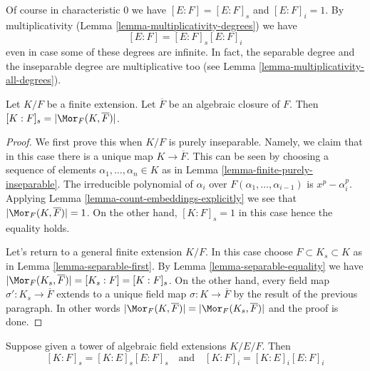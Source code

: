 \noindent
Of course in characteristic $0$ we have $[E : F] = [E : F]_s$ and
$[E : F]_i = 1$. By multiplicativity
(Lemma \ref{lemma-multiplicativity-degrees}) we have
$$
[E : F] = [E : F]_s [E : F]_i
$$
even in case some of these degrees are infinite. In fact, the separable
degree and the inseparable degree are multiplicative too (see
Lemma \ref{lemma-multiplicativity-all-degrees}).

\begin{lemma}
\label{lemma-separable-degree}
Let $K/F$ be a finite extension. Let $\overline{F}$ be an algebraic
closure of $F$. Then $[K : F]_s = |\Mor_F(K, \overline{F})|$.
\end{lemma}

\begin{proof}
We first prove this when $K/F$ is purely inseparable. Namely, we claim that
in this case there is a unique map $K \to \overline{F}$. This can be
seen by choosing a sequence of elements $\alpha_1, \ldots, \alpha_n \in K$
as in Lemma \ref{lemma-finite-purely-inseparable}. The irreducible polynomial
of $\alpha_i$ over $F(\alpha_1, \ldots, \alpha_{i - 1})$ is $x^p - \alpha_i^p$.
Applying Lemma \ref{lemma-count-embeddings-explicitly} we see that
$|\Mor_F(K, \overline{F})| = 1$. On the other hand, $[K : F]_s = 1$
in this case hence the equality holds.

\medskip\noindent
Let's return to a general finite extension $K/F$. In this case
choose $F \subset K_s \subset K$ as in Lemma \ref{lemma-separable-first}.
By Lemma \ref{lemma-separable-equality} we have
$|\Mor_F(K_s, \overline{F})| = [K_s : F] = [K : F]_s$.
On the other hand, every field map $\sigma' : K_s \to \overline{F}$
extends to a unique field map $\sigma : K \to \overline{F}$ by the
result of the previous paragraph. In other words
$|\Mor_F(K, \overline{F})| = |\Mor_F(K_s, \overline{F})|$
and the proof is done.
\end{proof}

\begin{lemma}[Multiplicativity]
\label{lemma-multiplicativity-all-degrees}
Suppose given a tower of algebraic field extensions $K/E/F$. Then
$$
[K : F]_s = [K : E]_s [E : F]_s
\quad\text{and}\quad
[K : F]_i = [K : E]_i [E : F]_i
$$
\end{lemma}

